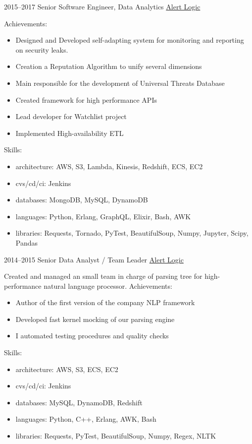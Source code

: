 \documentclass[11pt,a4paper]{moderncv}
\begin{document}
    \cventry
        {2015--2017}
        {Senior Software Engineer, Data Analytics}
        {\href{https://alertlogic.com}{Alert Logic}} {} {}
        {
            Achievements:
            \begin{itemize}
                \item Designed and Developed self-adapting system for
                    monitoring and reporting on security leaks.
                \item Creation a Reputation Algorithm to unify several dimensions
                \item Main responsible for the development of Universal Threats
                      Database
                \item Created framework for high performance APIs
                \item Lead developer for Watchlist project
                \item Implemented High-availability ETL
            \end{itemize}
            Skills:
            \begin{itemize}
                \item architecture: AWS, S3, Lambda, Kinesis, Redshift, ECS, EC2
                \item cvs/cd/ci: Jenkins
                \item databases: MongoDB, MySQL, DynamoDB
                \item languages: Python, Erlang, GraphQL, Elixir, Bash, AWK
                \item libraries: Requests, Tornado, PyTest, BeautifulSoup,
                    Numpy, Jupyter, Scipy, Pandas
            \end{itemize}
        }

    \cventry
        {2014--2015}
        {Senior Data Analyst / Team Leader}
        {\href{https://alertlogic.com}{Alert Logic}} {} {}
        {
            Created and managed an small team in charge of parsing tree for
                high-performance natural language processor.
            Achievements:
            \begin{itemize}
                \item Author of the first version of the company NLP framework
                \item Developed fast kernel mocking of our parsing engine
                \item I automated testing procedures and quality checks
            \end{itemize}
            Skills:
            \begin{itemize}
                \item architecture: AWS, S3, ECS, EC2
                \item cvs/cd/ci: Jenkins
                \item databases: MySQL, DynamoDB, Redshift
                \item languages: Python, C++, Erlang, AWK, Bash
                \item libraries: Requests, PyTest, BeautifulSoup, Numpy, Regex, NLTK
            \end{itemize}
        }
\end{document}
